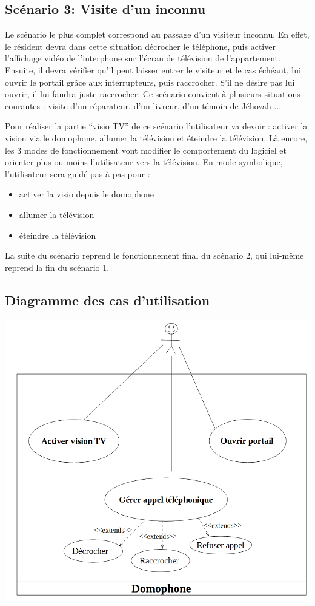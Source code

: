 \subsection{Scénario 3: Visite d'un inconnu}

Le scénario le plus complet correspond au passage d'un visiteur inconnu. En effet, le résident devra dans cette situation décrocher le téléphone, puis activer l'affichage vidéo de l'interphone sur l'écran de télévision de l'appartement. Ensuite, il devra vérifier qu'il peut laisser entrer le visiteur et le cas échéant, lui ouvrir le portail grâce aux interrupteurs, puis raccrocher. S'il ne désire pas lui ouvrir, il lui faudra juste raccrocher.
Ce scénario convient à plusieurs situations courantes : visite d'un réparateur, d'un livreur, d'un témoin de Jéhovah ...

Pour réaliser la partie "`visio TV"' de ce scénario l'utilisateur va devoir : activer la vision via le domophone, allumer la télévision et éteindre la télévision. Là encore, les 3 modes de fonctionnement vont modifier le comportement du logiciel et orienter plus ou moins l'utilisateur vers la télévision. En mode symbolique, l'utilisateur sera guidé pas à pas pour : 
\begin{itemize}
	\item activer la visio depuis le domophone
	\item allumer la télévision
	\item éteindre la télévision
\end{itemize}
La suite du scénario reprend le fonctionnement final du scénario 2, qui lui-même reprend la fin du scénario 1.

\subsection{Diagramme des cas d'utilisation}
\includegraphics[scale=0.7]{1-PreEtude/img/use_case_diag.PNG}
